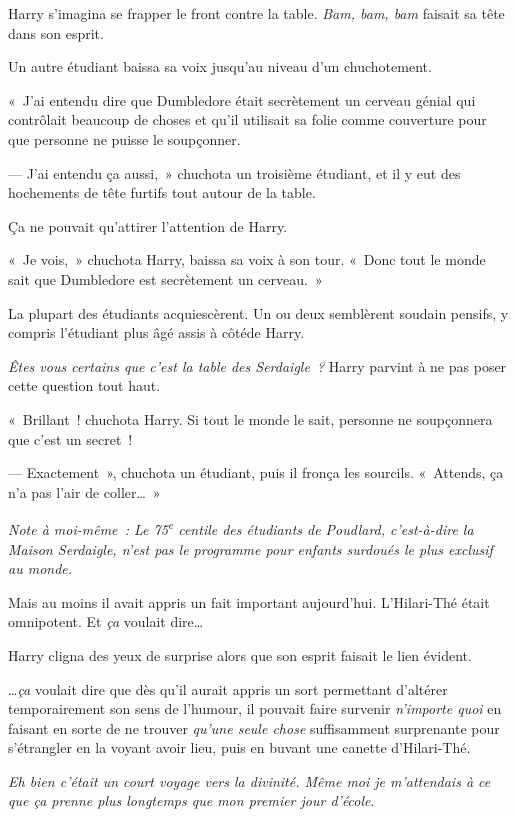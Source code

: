 Harry s'imagina se frapper le front contre la table. \emph{Bam, bam, bam} faisait sa tête dans son esprit.

Un autre étudiant baissa sa voix jusqu'au niveau d'un chuchotement.

«~J'ai entendu dire que Dumbledore était secrètement un cerveau génial qui contrôlait beaucoup de choses et qu'il utilisait sa folie comme couverture pour que personne ne puisse le soupçonner.

--- J'ai entendu ça aussi,~» chuchota un troisième étudiant, et il y eut des hochements de tête furtifs tout autour de la table.

Ça ne pouvait qu'attirer l'attention de Harry.

«~Je vois,~» chuchota Harry, baissa sa voix à son tour. «~Donc tout le monde sait que Dumbledore est secrètement un cerveau.~»

La plupart des étudiants acquiescèrent. Un ou deux semblèrent soudain pensifs, y compris l'étudiant plus âgé assis à côtéde Harry.

\emph{Êtes vous certains que c'est la table des Serdaigle~?} Harry parvint à ne pas poser cette question tout haut.

«~Brillant~! chuchota Harry. Si tout le monde le sait, personne ne soupçonnera que c'est un secret~!

--- Exactement~», chuchota un étudiant, puis il fronça les sourcils. «~Attends, ça n'a pas l'air de coller…~»

\emph{Note à moi-même~: Le 75\textsuperscript{e} centile des étudiants de Poudlard, c'est-à-dire la Maison Serdaigle, n'est pas le programme pour enfants surdoués le plus exclusif au monde.}

Mais au moins il avait appris un fait important aujourd'hui. L'Hilari-Thé était omnipotent. Et \emph{ça} voulait dire…

Harry cligna des yeux de surprise alors que son esprit faisait le lien évident.

…\emph{ça} voulait dire que dès qu'il aurait appris un sort permettant d'altérer temporairement son sens de l'humour, il pouvait faire survenir \emph{n'importe quoi} en faisant en sorte de ne trouver \emph{qu'une seule chose} suffisamment surprenante pour s'étrangler en la voyant avoir lieu, puis en buvant une canette d'Hilari-Thé.

\emph{Eh bien c'était un court voyage vers la divinité. Même moi je m'attendais à ce que ça prenne plus longtemps que mon premier jour d'école}.

